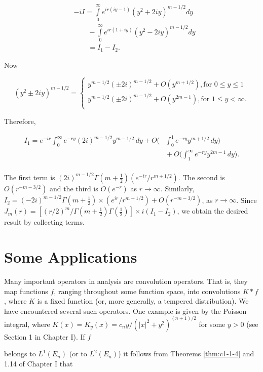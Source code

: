 \[
\begin{aligned}&-i I=\int\limits_{0}^{\infty}e^{i r(i y-1)}(y^{2}+2i y)^{m-1/2}d y\\
&\qquad-\int\limits_{0}^{\infty}e^{i r(1+i y)}(y^{2}-2i y)^{m-1/2}d y\\
&\qquad=I_{1}-I_{2}.\end{aligned}
\]

Now

\[
(y^{2}\pm2i y)^{m-1/2}=\left\{\begin{matrix}{y^{m-1/2}(\pm2i)^{m-1/2}+O(y^{m+1/2}),\text{for }0\leq y\leq1}\\ {y^{m-1/2}(\pm2i)^{m-1/2}+O(y^{2m-1}),\text{for }1\leq y<\infty.}\\ \end{matrix}\right.
\]

Therefore,

\[
\begin{aligned}{I_{1}= e^{-i r}\int_{0}^{\infty}e^{-r y}(2i)^{m-1/2}y^{m-1/2}\,dy+O\bigg(}&{{}\int_{0}^{1}e^{-r y}y^{m+1/2}\,dy\bigg)}\\ {}&{{}+O\bigg(\int_{1}^{\infty}e^{-r y}y^{2m-1}\,dy\bigg).}\\ \end{aligned}
\]

The first term is $(2i)^{m-1/2}\Gamma(m+\frac{1}{2})(e^{-ir}/r^{m+1/2})$. The second is $O(r^{-m-3/2})$ and the third is $O(e^{-r})$ as $r\to\infty$. Similarly, $I_{2}=(-2i)^{m-1/2}\Gamma(m+\frac{1}{2})\times(e^{ir}/r^{m+1/2})+O(r^{-m-3/2})$, as $r\to\infty$. Since $J_{m}(r)=[(r/2)^{m}/\Gamma(m+\frac{1}{2})\Gamma(\frac{1}{2})]\times i(I_{1}-I_{2})$, we obtain the desired result by collecting terms.

\section{Some Applications}

Many important operators in analysis are convolution operators. That is, they map functions $f$, ranging throughout some function space, into convolutions $K* f$, where $K$ is a fixed function (or, more generally, a tempered distribution). We have encountered several such operators. One example is given by the Poisson integral, where $K(x) = K_y(x) = c_ny/(|x|^2 + y^2)^{(n+1)/2}$ for some $y > 0$ (see Section 1 in Chapter I). If $f$

belongs to $L^{1}(E_{n})$ (or to $L^{2}(E_{n})$) it follows from Theorems \ref{thm:c1-1-4} and 1.14 of Chapter I that


